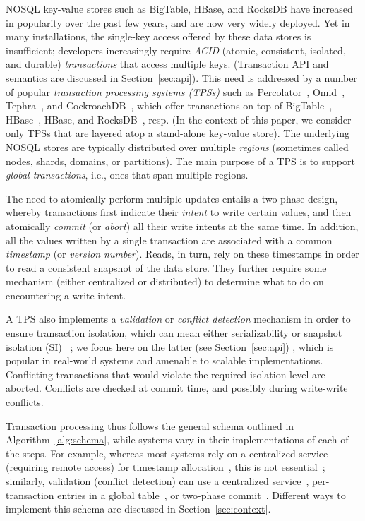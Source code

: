 
NOSQL key-value stores such as BigTable, HBase, and RocksDB have increased in popularity over the past few years, and are now very widely deployed. Yet in many installations, the single-key access offered by these data stores is insufficient; developers  increasingly require 
 \emph{ACID} (atomic, consistent, isolated, and durable) \emph{transactions} that access multiple keys.
 (Transaction API and semantics are discussed in Section~\ref{sec:api}).
This need is addressed by a number of popular  \emph{transaction processing systems (TPSs)} 
such as  Percolator~\cite{Percolator2010}, Omid~\cite{OmidICDE2014,omid-blog}, Tephra~\cite{tephra}, and CockroachDB~\cite{cockroach}, 
which offer transactions on top of  BigTable~\cite{bigtable-osdi06}, HBase~\cite{hbase}, HBase, and RocksDB~\cite{rocksdb}, resp. 
(In the context of this paper, we consider only TPSs that are layered atop a stand-alone key-value store). 
The underlying NOSQL stores are typically distributed  over multiple \emph{regions} (sometimes called nodes, shards, domains, or partitions).
The main purpose of a TPS is to support \emph{global transactions}, i.e., ones that span multiple regions.

The need to atomically perform multiple  updates  entails a two-phase design, whereby transactions first indicate their \emph{intent} to write certain values, and then atomically \emph{commit} (or \emph{abort}) all their write intents at the same time. In addition, 
all the values written by a single transaction are associated with a common  \emph{timestamp} (or \emph{version number}). 
Reads, in turn, rely on these timestamps in order to read a consistent snapshot of the data store. They further  
require some mechanism (either centralized or distributed) to determine what to do on encountering a write intent.

A TPS also implements  a \emph{validation} or \emph{conflict detection} mechanism in order to ensure transaction isolation, which can mean
either serializability or snapshot isolation (SI) ~\cite{DBLP:conf/sigmod/BerensonBGMOO95}; we focus here on the
latter (see Section~\ref{sec:api}) ,  which is popular in real-world systems  and amenable to scalable implementations.
Conflicting transactions that would violate the required isolation level are
aborted. Conflicts are checked at commit time, and possibly during write-write conflicts.

Transaction processing thus follows the general schema outlined in Algorithm~\ref{alg:schema}, 
while systems vary in their implementations of each of the steps. 
For example, whereas most systems rely on a centralized service (requiring remote access) for timestamp allocation~\cite{OmidICDE2014,omid-blog,tephra,Percolator2010}, this is not essential~\cite{cockroach}; similarly, validation (conflict detection) can use a centralized service~\cite{OmidICDE2014,omid-blog,tephra}, per-transaction entries in a global table~\cite{cockroach}, or two-phase commit~\cite{Percolator2010}. 
Different ways to implement this schema are  discussed in Section~\ref{sec:context}.
 
